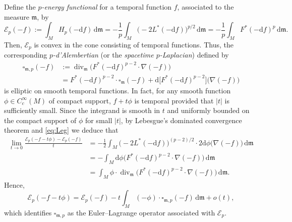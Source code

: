 \documentclass[a4paper,11pt]{article}
\numberwithin{equation}{section}
\theoremstyle{definition}
\theoremstyle{plain}
\newcommand{\dd}{\mathrm{d}}
\newcommand{\cE}{\ensuremath{\mathcal{E}}}
\newcommand{\fm}{\ensuremath{\mathfrak{m}}}
\def\div{\mathop{\mathrm{div}}\nolimits}
\begin{document}
Define the \emph{$p$-energy functional} for a temporal function $f$,
associated to the measure $\fm$, by
\begin{equation*}
\cE_p(-f) := \int_M H_p(-\dd f) \,\dd \fm
 = -\frac{1}{p} \int_M \bigl(  -2L^*(-\dd f) \bigr)^{p/2} \,\dd\fm
 =-\frac{1}{p} \int_M F^*(-\dd f)^p \,\dd\fm.
\end{equation*}
Then, $\cE_p$ is convex in the cone consisting of temporal functions.
Thus, the corresponding \emph{$p$-d'Alembertian} (or the \emph{spacetime $p$-Laplacian}) defined by
\begin{equation}\label{eq:p-dA}
\begin{split}
\square_{\fm,p}(-f)
&:=\div_{\fm} \bigl( F^*(-\dd f)^{p-2} \cdot \nabla(-f) \bigr) \\
&= F^*(-\dd f)^{p-2} \cdot \square_\fm(-f) +\dd\bigl[ F^*(-\dd f)^{p-2} \bigr] \bigl( \nabla(-f) \bigr)
\end{split}
\end{equation}
is elliptic on smooth temporal functions. 
In fact,  for any smooth function $\phi \in C^{\infty}_c(M)$ of compact support, $f+t\phi$ is temporal provided that $|t|$ is sufficiently small. Since the integrand is smooth in $t$ and uniformly bounded on the compact support of $\phi$ for small $|t|$, by Lebesgue's dominated convergence theorem and \eqref{eq:Leg} we deduce that
\begin{align*}
\lim_{t \to 0} \frac{\cE_p(-f-t\phi) -\cE_p(-f)}{t}
&= -\frac{1}{2} \int_M \bigl( -2L^*(-\dd f) \bigr)^{(p-2)/2} \cdot 2\dd\phi \bigl( \nabla(-f) \bigr) \,\dd\fm \\
&= -\int_M \dd\phi \bigl( F^*(-\dd f)^{p-2} \cdot \nabla(-f) \bigr) \,\dd\fm \\
&= \int_M \phi \cdot \div_\fm \bigl( F^*(-\dd f)^{p-2} \cdot \nabla(-f) \bigr) \,\dd\fm.
\end{align*}
Hence, 
\[ \cE_p(-f-t\phi) =\cE_p(-f)
 -t \int_M (-\phi) \cdot \square_{\fm,p}(-f) \,\dd\fm +o(t), \]
which identifies $\square_{\fm,p}$ as the Euler--Lagrange operator associated with $\cE_p$.
\end{document}
